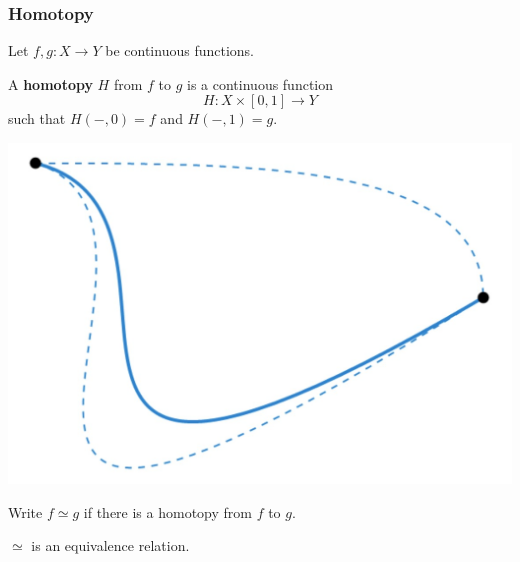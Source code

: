 \documentclass[handout]{beamer} %
\begin{document}
\begin{frame}
  \frametitle{Homotopy}

  Let $f, g : X \to Y$ be continuous functions.

  \begin{definition}
    A \textbf{homotopy} $H$ from $f$ to $g$ is a continuous function
    \[
      H : X \times [0, 1] \to Y
    \]
    such that $H(-, 0) = f$ and $H(-, 1) = g$.
  \end{definition}
  
  \begin{center}
    \includegraphics[scale=0.2]{Homotopy.jpg}
  \end{center}

  Write $f \simeq g$ if there is a homotopy from $f$ to $g$.

  $\simeq$ is an equivalence relation.
\end{frame}

\end{document}

